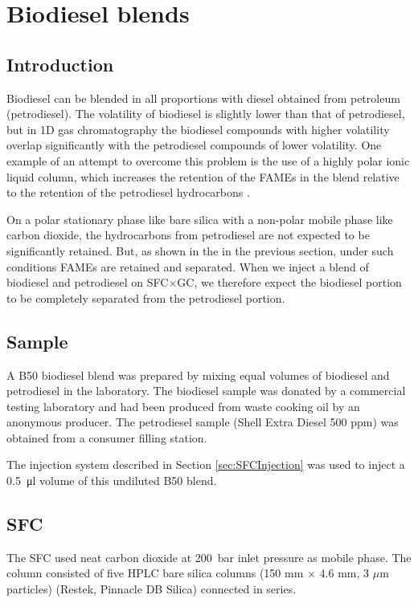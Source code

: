 \section{Biodiesel blends}

\subsection{Introduction}
Biodiesel can be blended in all proportions with diesel obtained from petroleum
(petrodiesel). The volatility of biodiesel is slightly lower than that of
petrodiesel, but in 1D gas chromatography the biodiesel compounds with higher
volatility overlap significantly with the petrodiesel compounds of lower
volatility. One example of an attempt to overcome this problem is the use of a
highly polar ionic liquid column, which increases the retention of the FAMEs in
the blend relative to the retention of the petrodiesel hydrocarbons
\autocite{Ragonese2009}.

On a polar stationary phase like bare silica with a non-polar mobile phase
like carbon dioxide, the hydrocarbons from petrodiesel are not expected to be
significantly retained. But, as shown in the in the previous section, under such
conditions FAMEs are retained and separated. When we inject a blend of biodiesel
and petrodiesel on SFC×GC, we therefore expect the biodiesel portion to be
completely separated from the petrodiesel portion.

\subsection{Sample}

A B50 biodiesel blend was prepared by mixing equal volumes of biodiesel and
petrodiesel in the laboratory. The biodiesel sample was donated by a commercial
testing laboratory and had been produced from waste cooking oil by an anonymous
producer. The petrodiesel sample (Shell Extra Diesel 500 ppm) was obtained from
a consumer filling station.

The injection system described in Section \ref{sec:SFCInjection} was used to
inject a \SI{0.5}{\micro\litre} volume of this undiluted B50 blend.

\subsection{SFC}

The SFC used neat carbon dioxide at \SI{200}{\bar} inlet pressure as mobile
phase. The column consisted of five HPLC bare silica columns (150 mm $\times$
4.6 mm, 3 $\mu$m particles) (Restek, Pinnacle DB Silica) connected in series.

